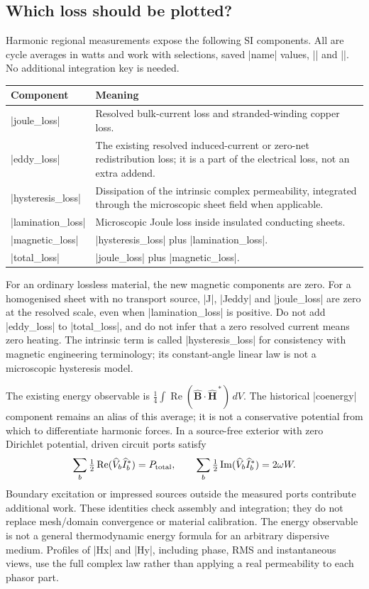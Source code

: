 \subsection{Which loss should be plotted?}
Harmonic regional measurements expose the following SI components. All are
cycle averages in watts and work with selections, saved |name| values,
|\femmvalue| and |\femmresultplot|. No additional integration key is needed.
\begin{center}
\begin{tabular}{lp{.63\linewidth}}
\toprule
Component & Meaning\\
\midrule
|joule_loss| & Resolved bulk-current loss and stranded-winding copper loss.\\
|eddy_loss| & The existing resolved induced-current or zero-net redistribution loss; it is a part of the electrical loss, not an extra addend.\\
|hysteresis_loss| & Dissipation of the intrinsic complex permeability, integrated through the microscopic sheet field when applicable.\\
|lamination_loss| & Microscopic Joule loss inside insulated conducting sheets.\\
|magnetic_loss| & |hysteresis_loss| plus |lamination_loss|.\\
|total_loss| & |joule_loss| plus |magnetic_loss|.\\
\bottomrule
\end{tabular}
\end{center}
For an ordinary lossless material, the new magnetic components are zero.
For a homogenised sheet with no transport source, |J|, |Jeddy| and |joule_loss|
are zero at the resolved scale, even when |lamination_loss| is positive.
Do not add |eddy_loss| to |total_loss|, and do not infer that a zero resolved
current means zero heating. The intrinsic term is called |hysteresis_loss|
for consistency with magnetic engineering terminology; its constant-angle
linear law is not a microscopic hysteresis model.

The existing energy observable is
$\tfrac14\int\operatorname{Re}(\widehat{\mathbf B}\cdot
\widehat{\mathbf H}^{\,*})\,dV$.
The historical |coenergy| component remains an alias of this average; it is
not a conservative potential from which to differentiate harmonic forces.
In a source-free exterior with zero Dirichlet potential, driven circuit ports
satisfy
\[
 \sum_b\tfrac12\operatorname{Re}(\widehat V_b\widehat I_b^*)
      =P_{\rm total},\qquad
 \sum_b\tfrac12\operatorname{Im}(\widehat V_b\widehat I_b^*)
      =2\omega W.
\]
Boundary excitation or impressed sources outside the measured ports contribute
additional work. These identities check assembly and integration; they do not
replace mesh/domain convergence or material calibration. The energy observable
is not a general thermodynamic energy formula for an arbitrary dispersive medium.
Profiles of |Hx| and |Hy|, including phase, RMS and instantaneous views, use the
full complex law rather than applying a real permeability to each phasor part.

